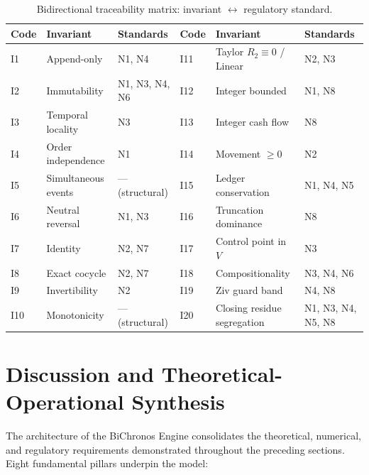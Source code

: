 \documentclass[11pt, a4paper]{article}
\theoremstyle{definition}
\theoremstyle{plain}
\theoremstyle{remark}
\begin{document}
\begin{table}[htbp]
\centering
\small
\setlength{\tabcolsep}{3pt}
\begin{tabular}{@{}lll@{\hspace{0.8em}}lll@{}}
\toprule
\textbf{Code} & \textbf{Invariant} & \textbf{Standards} & \textbf{Code} & \textbf{Invariant} & \textbf{Standards} \\
\midrule
I1  & Append-only         & N1, N4           & I11 & Taylor $R_2\equiv 0$ / Linear & N2, N3 \\
I2  & Immutability        & N1, N3, N4, N6   & I12 & Integer bounded               & N1, N8 \\
I3  & Temporal locality   & N3               & I13 & Integer cash flow             & N8 \\
I4  & Order independence  & N1               & I14 & Movement $\ge 0$              & N2 \\
I5  & Simultaneous events & --- (structural) & I15 & Ledger conservation           & N1, N4, N5 \\
I6  & Neutral reversal    & N1, N3           & I16 & Truncation dominance          & N8 \\
I7  & Identity            & N2, N7           & I17 & Control point in $V$          & N3 \\
I8  & Exact cocycle       & N2, N7           & I18 & Compositionality              & N3, N4, N6 \\
I9  & Invertibility       & N2               & I19 & Ziv guard band                & N4, N8 \\
I10 & Monotonicity        & --- (structural) & I20 & Closing residue segregation   & N1, N3, N4, N5, N8 \\
\bottomrule
\end{tabular}
\caption{Bidirectional traceability matrix: invariant $\leftrightarrow$ regulatory standard.}
\label{tab:10}
\end{table}

\section{Discussion and Theoretical-Operational Synthesis}\label{sec:discussao}

The architecture of the BiChronos Engine consolidates the theoretical, numerical, and regulatory requirements demonstrated throughout the preceding sections. Eight fundamental pillars underpin the model:
\end{document}
